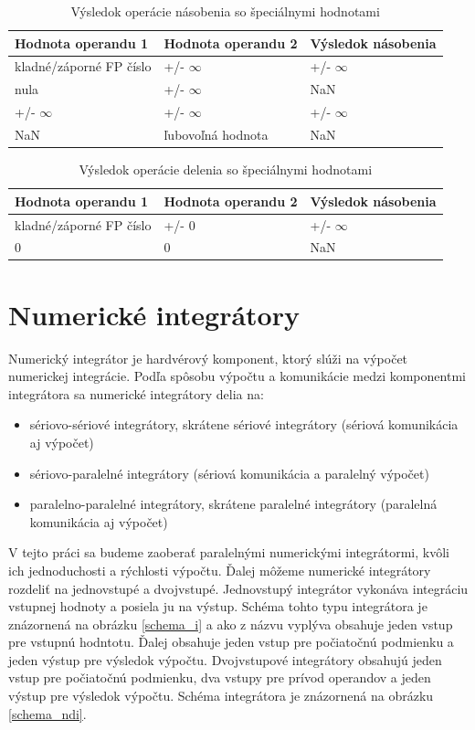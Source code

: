 \begin{table}[h]
\centering
\begin{tabular}{|l|l|l|}
\hline
\rowcolor[HTML]{C0C0C0} 
Hodnota operandu 1 & Hodnota operandu 2 & Výsledok násobenia \\ \hline
kladné/záporné FP číslo & +/- $ \infty $ & +/- $ \infty $ \\ \hline
nula           & +/- $ \infty $ & NaN \\ \hline
+/- $ \infty $ & +/- $ \infty $ & +/- $ \infty $ \\ \hline
NaN & ľubovoľná hodnota & NaN \\ \hline
\end{tabular}
\caption{Výsledok operácie násobenia so špeciálnymi hodnotami}
\label{special_nasobenie}
\end{table}

\begin{table}[h]
\centering
\begin{tabular}{|l|l|l|}
\hline
\rowcolor[HTML]{C0C0C0} 
Hodnota operandu 1 & Hodnota operandu 2 & Výsledok násobenia \\ \hline
kladné/záporné FP číslo & +/- 0 & +/- $ \infty $ \\ \hline
0 & 0 & NaN \\ \hline
\end{tabular}
\caption{Výsledok operácie delenia so špeciálnymi hodnotami}
\label{special_delenie}
\end{table}

\chapter{Numerické integrátory} \label{NUM_INTEGRATORY}
Numerický integrátor je hardvérový komponent, ktorý slúži na výpočet numerickej integrácie. Podľa spôsobu výpočtu a komunikácie medzi komponentmi integrátora sa numerické integrátory delia na:

\begin{itemize}
\item sériovo-sériové integrátory, skrátene sériové integrátory (sériová komunikácia aj výpočet)
\item sériovo-paralelné integrátory (sériová komunikácia a paralelný výpočet)
\item paralelno-paralelné integrátory, skrátene paralelné integrátory (paralelná komunikácia aj výpočet)
\end{itemize}

V tejto práci sa budeme zaoberať paralelnými numerickými integrátormi, kvôli ich jednoduchosti a rýchlosti výpočtu. Ďalej môžeme numerické integrátory rozdeliť na jednovstupé a dvojvstupé. Jednovstupý integrátor vykonáva integráciu vstupnej hodnoty a posiela ju na výstup. Schéma tohto typu integrátora je znázornená na obrázku \ref{schema_i} a ako z názvu vyplýva obsahuje jeden vstup pre vstupnú hodntotu. Ďalej obsahuje jeden vstup pre počiatočnú podmienku a jeden výstup pre výsledok výpočtu. Dvojvstupové integrátory obsahujú jeden vstup pre počiatočnú podmienku, dva vstupy pre prívod operandov a jeden výstup pre výsledok výpočtu. Schéma integrátora je znázornená na obrázku \ref{schema_ndi}.


